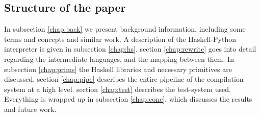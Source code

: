 

\subsection{Structure of the paper}
In subsection \ref{chap:back} we present background information, including 
some terms and concepts and similar work. 
%
A description of the 
Haskell-Python interpreter is given in subsection \ref{chap:hs}.
%
section \ref{chap:rewrite} goes into detail regarding the intermediate 
languages, and the mapping between them.
%
In subsection \ref{chap:prims} the Haskell libraries and necessary primitives
are discussed.
%
section \ref{chap:pipe} describes the entire pipeline of the compilation system 
at a high level.
%
section \ref{chap:test} describes the test-system used.
%
Everything is wrapped up in subsection \ref{chap:conc}, which discusses the 
results and future work.
